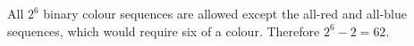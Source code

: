 All $2^6$ binary colour sequences are allowed except the all-red and all-blue sequences, which would require six of a colour. Therefore $2^6-2=\boxed{62}$.
